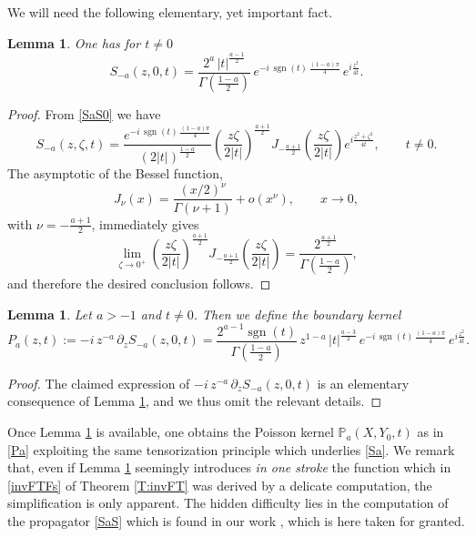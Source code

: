 \documentclass[11pt,letter]{amsart}
\numberwithin{equation}{section}
\newtheorem{lemma}[theorem]{Lemma}
\numberwithin{equation}{section}
\begin{document}
We will need the following elementary, yet important fact.
\begin{lemma}\label{L:S-a}
One has for $t\not= 0$
\[
S_{-a}(z,0,t) 
=
\frac{2^a\,|t|^{\frac{a-1}{2}}}
     {\Gamma\!\left(\frac{1-a}{2}\right)}
\,e^{-i\,\operatorname{sgn}(t)\,\frac{(1-a)\pi}{4}}
\,e^{i\frac{z^2}{4t}}.
\]
\end{lemma}


\begin{proof}
From \eqref{SaS0} we have
\[
S_{-a}(z,\zeta,t)
=
\frac{e^{-i\,\operatorname{sgn}(t)\,\frac{(1-a)\pi}{4}}}
     {(2|t|)^{\frac{1-a}{2}}}
\left(\frac{z\zeta}{2|t|}\right)^{\frac{a+1}{2}}
J_{-\frac{a+1}{2}}\!\left(\frac{z\zeta}{2|t|}\right)
e^{i\frac{z^{2}+\zeta^{2}}{4t}},
\qquad t\neq 0.
\]
The asymptotic of the Bessel function,
\[
J_\nu(x)
=
\frac{(x/2)^\nu}{\Gamma(\nu+1)}
+o\!\left(x^\nu\right),
\qquad x\to0,
\]
with \(\nu=-\frac{a+1}{2}\), immediately gives
\[
\lim_{\zeta\to0^+}
\left(\frac{z\zeta}{2|t|}\right)^{\frac{a+1}{2}}
J_{-\frac{a+1}{2}}
\!\left(\frac{z\zeta}{2|t|}\right)
=
\frac{2^{\frac{a+1}{2}}}
     {\Gamma\!\left(\frac{1-a}{2}\right)},
\]
and therefore the desired conclusion follows.





\end{proof}

\begin{lemma}\label{L:Smenoa}
Let \(a>-1\) and \(t\neq 0\). Then we define the boundary kernel 
\[
P_{a}(z,t) := -i\,z^{-a}\,\partial_z S_{-a}(z,0,t)
=
\frac{2^{a-1}\operatorname{sgn}(t)}{\Gamma\!\left(\frac{1-a}{2}\right)}
\,z^{1-a}\,|t|^{\frac{a-3}{2}}
\,e^{-i\,\operatorname{sgn}(t)\,\frac{(1-a)\pi}{4}}
\,e^{i\frac{z^2}{4t}}.
\]
\end{lemma}

\begin{proof}
The claimed expression of $-i\,z^{-a}\,\partial_z S_{-a}(z,0,t)$ is an elementary consequence of Lemma \ref{L:S-a}, and we thus omit the relevant details.


\end{proof}

Once Lemma \ref{L:Smenoa} is available, one obtains the Poisson kernel $\mathbb P_a(X,Y_0,t)$ as in \eqref{Pa} exploiting the same tensorization principle which underlies \eqref{Sa}. We remark that, even if Lemma \ref{L:Smenoa} seemingly introduces \emph{in one stroke} the function which in \eqref{invFTFs} of Theorem \ref{T:invFT} was derived by a delicate computation, the simplification is only apparent. The hidden difficulty lies in the computation of the propagator \eqref{SaS} which is found in our work \cite{GS1}, which is here taken for granted. 
\end{document}
